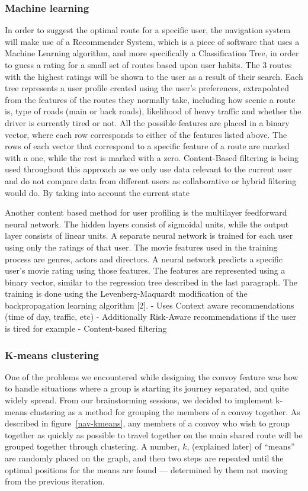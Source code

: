 \documentclass{article}
\begin{document}
\subsubsection{Machine learning}\label{sssec:nav-tech-machinelearning}
In order to suggest the optimal route for a specific user, the navigation system will make use of a Recommender System, which is a piece of software that uses a Machine Learning algorithm, and more specifically a Classification Tree, in order to guess a rating for a small set of routes based upon user habits. The 3 routes with the highest ratings will be shown to the user as a result of their search. Each tree represents a user profile created using the user’s preferences, extrapolated from the features of the routes they normally take, including how scenic a route is, type of roads (main or back roads), likelihood of heavy traffic and whether the driver is currently tired or not. All the possible features are placed in a binary vector, where each row corresponds to either of the features listed above. The rows of each vector that correspond to a specific feature of a route are marked with a one, while the rest is marked with a zero. Content-Based filtering is being used throughout this approach as we only use data relevant to the current user and do not compare data from different users as collaborative or hybrid filtering would do. By taking into account the current state 

Another content based method for user profiling is the multilayer feedforward neural network. The hidden layers consist of sigmoidal units, while the output layer consists of linear units. A separate neural network is trained for each user using only the ratings of that user. The movie features used in the training process are genres, actors and directors. A neural network predicts a specific user’s movie rating using those features. The features are represented using a binary vector, similar to the regression tree described in the last
paragraph. The training is done using the Levenberg-Maquardt modification of the backpropagation learning algorithm [2].
- Uses Context aware recommendations (time of day, traffic, etc)
    - Additionally Risk-Aware recommendations if the user is tired for example
- Content-based filtering
%
%
\subsubsection{K-means clustering}\label{sssec:nav-tech-kmeans}
One of the problems we encountered while designing the convoy feature was how to handle situations where a group is starting its journey separated, and quite widely spread. From our brainstorming sessions, we decided to implement k-means clustering as a method for grouping the members of a convoy together. As described in figure~\ref{nav-kmeans}, any members of a convoy who wish to group together as quickly as possible to travel together on the main shared route will be grouped together through clustering. A number, $k$, (explained later) of ``means'' are randomly placed on the graph, and then two steps are repeated until the optimal positions for the means are found --- determined by them not moving from the previous iteration.
\end{document}
